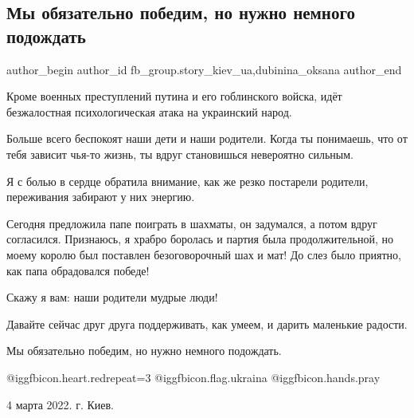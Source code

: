  
 
 
 
 
 
\subsection{Мы обязательно победим, но нужно немного подождать}
\label{sec:04_03_2022.fb.fb_group.story_kiev_ua.1.shahmaty}
 
\ifcmt
 author_begin
   author_id fb_group.story_kiev_ua,dubinina_oksana
 author_end
\fi

Кроме военных преступлений путина и его гоблинского войска, идёт безжалостная
психологическая атака на украинский народ. 

\raggedcolumns
\begin{multicols}{2} %
\setlength{\parindent}{0pt}


\end{multicols} %

Больше всего беспокоят наши дети и наши родители. Когда ты понимаешь, что от
тебя зависит чья-то жизнь, ты вдруг становишься невероятно сильным. 

Я с болью в сердце обратила внимание, как же резко постарели родители,
переживания забирают у них энергию. 

Сегодня предложила папе поиграть в шахматы, он задумался, а потом вдруг
согласился. Признаюсь, я храбро боролась и партия была продолжительной, но
моему королю был поставлен безоговорочный шах и мат! До слез было приятно, как
папа обрадовался победе!

Скажу я вам: наши родители мудрые люди!

Давайте сейчас друг друга поддерживать, как умеем, и дарить маленькие радости. 

Мы обязательно победим, но нужно немного подождать. 

@igg{fbicon.heart.red}{repeat=3} @igg{fbicon.flag.ukraina}
@igg{fbicon.hands.pray} 

4 марта 2022. г. Киев.
